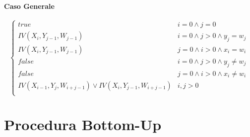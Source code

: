 \paragraph{Caso Generale}

\[
    \begin{cases}
        \text{$true$} & \text{$i = 0 \land j = 0$} \\
        \text{$IV(X_i, Y_{j - 1}, W_{j-1})$} & \text{$i = 0 \land j > 0 \land y_j = w_j$} \\
        \text{$IV(X_i, Y_{j - 1}, W_{j-1})$} & \text{$j = 0 \land i > 0 \land x_i = w_i$} \\
        \text{$false$} & \text{$i = 0 \land j > 0 \land y_j \ne w_j$} \\
        \text{$false$} & \text{$j = 0 \land i > 0 \land x_i \ne w_i$} \\
        \text{$IV(X_{i-1}, Y_j, W_{i+j-1})\lor IV(X_i, Y_{j-1}, W_{i+j-1})$} & \text{$i,j > 0$} \\
    \end{cases}
\]

\newpage

\section{Procedura Bottom-Up}

\begin{algorithm}
    \begin{algorithmic}
        \EndProcedure
    \end{algorithmic}
\end{algorithm}

